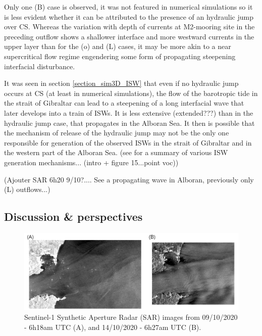 Only one (B) case is observed, it was not featured in numerical simulations so it is less evident whether it can be attributed to the presence of an hydraulic jump over CS. Whereas the variation with depth of currents at M2-mooring site in the preceding outflow shows a shallower interface and more westward currents in the upper layer than for the (o) and (L) cases, it may be more akin to a near supercritical flow regime engendering some form of propagating steepening interfacial disturbance.

It was seen in section \ref{section_sim3D_ISW} that even if no hydraulic jump occurs at CS (at least in numerical simulations), the flow of the barotropic tide in the strait of Gibraltar can lead to a steepening of a long interfacial wave that later develops into a train of ISWs. \color{blue} It is less extensive (extended???) than in the hydraulic jump case, that propagates in the Alboran Sea. \color{black} It then is possible that the mechanism of release of the hydraulic jump may not be the only one responsible for generation of the observed ISWs in the strait of Gibraltar and in the western part of the Alboran Sea.  \color{green}(see \citet{chen_2017} for a summary of various ISW generation mechanisms... (intro + figure 15...point voc)) 

(Ajouter SAR 6h20 9/10?.... See a propagating wave in Alboran, previously only (L) outflows...)\color{black}

\color{blue}
\subsection{Discussion \& perspectives}

\begin{figure}[!h]
 \includegraphics[width=\textwidth]{./GBR3D/SAR_OBS_GEPETO.png}
 \caption {Sentinel-1 Synthetic Aperture Radar (SAR) images from 09/10/2020 - 6h18am UTC (A), and 14/10/2020 - 6h27am UTC (B).}
 \label{fig_SAROBS}
\end{figure}

